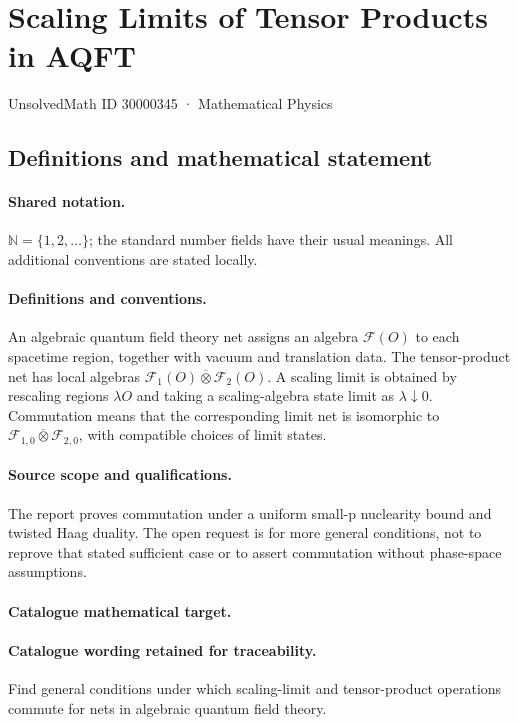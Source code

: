 \documentclass[11pt]{article}
\begin{document}
\setcounter{section}{30000344}
\section{Scaling Limits of Tensor Products in AQFT}\label{30000345}
{\small UnsolvedMath ID 30000345 · Mathematical Physics}
\subsection{Definitions and mathematical statement}

\paragraph{Shared notation.}$\mathbb N=\{1,2,\ldots\}$; the standard number fields have their usual meanings. All additional conventions are stated locally.


\paragraph{Definitions and conventions.} An algebraic quantum field theory net assigns an algebra $\mathcal F(O)$ to each spacetime region, together with vacuum and translation data. The tensor-product net has local algebras $\mathcal F_1(O)\overline\otimes\mathcal F_2(O)$. A scaling limit is obtained by rescaling regions $\lambda O$ and taking a scaling-algebra state limit as $\lambda\downarrow0$. Commutation means that the corresponding limit net is isomorphic to $\mathcal F_{1,0}\overline\otimes\mathcal F_{2,0}$, with compatible choices of limit states.

\paragraph{Source scope and qualifications.} The report proves commutation under a uniform small-p nuclearity bound and twisted Haag duality. The open request is for more general conditions, not to reprove that stated sufficient case or to assert commutation without phase-space assumptions.

\paragraph{Catalogue mathematical target.}
\paragraph{Catalogue wording retained for traceability.}
Find general conditions under which scaling-limit and tensor-product operations commute for nets in algebraic quantum field theory.
\end{document}
